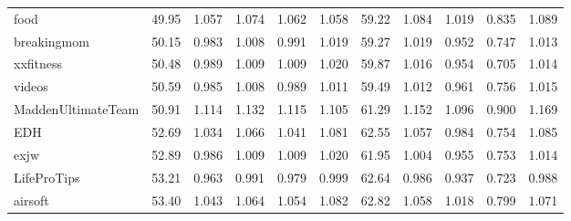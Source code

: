 \begin{tabular}{lrrrrrrrrrr}
food                &         49.95 &               1.057 &               1.074 &               1.062 &               1.058 &                59.22 &                      1.084 &                      1.019 &                      0.835 &                      1.089 \\
breakingmom         &         50.15 &               0.983 &               1.008 &               0.991 &               1.019 &                59.27 &                      1.019 &                      0.952 &                      0.747 &                      1.013 \\
xxfitness           &         50.48 &               0.989 &               1.009 &               1.009 &               1.020 &                59.87 &                      1.016 &                      0.954 &                      0.705 &                      1.014 \\
videos              &         50.59 &               0.985 &               1.008 &               0.989 &               1.011 &                59.49 &                      1.012 &                      0.961 &                      0.756 &                      1.015 \\
MaddenUltimateTeam  &         50.91 &               1.114 &               1.132 &               1.115 &               1.105 &                61.29 &                      1.152 &                      1.096 &                      0.900 &                      1.169 \\
EDH                 &         52.69 &               1.034 &               1.066 &               1.041 &               1.081 &                62.55 &                      1.057 &                      0.984 &                      0.754 &                      1.085 \\
exjw                &         52.89 &               0.986 &               1.009 &               1.009 &               1.020 &                61.95 &                      1.004 &                      0.955 &                      0.753 &                      1.014 \\
LifeProTips         &         53.21 &               0.963 &               0.991 &               0.979 &               0.999 &                62.64 &                      0.986 &                      0.937 &                      0.723 &                      0.988 \\
airsoft             &         53.40 &               1.043 &               1.064 &               1.054 &               1.082 &                62.82 &                      1.058 &                      1.018 &                      0.799 &                      1.071 \\

\end{tabular}
